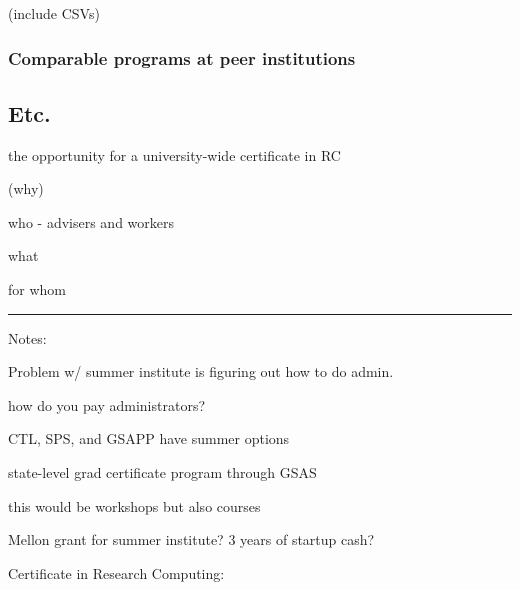 \documentclass[%
  ,
  article,
  ,
  oneside
  ]{memoir}
\begin{document}
(include CSVs)

\hypertarget{comparable-programs-at-peer-institutions}{%
\subsubsection{Comparable programs at peer
institutions}\label{comparable-programs-at-peer-institutions}}

\hypertarget{etc.}{%
\subsection{Etc.}\label{etc.}}

the opportunity for a university-wide certificate in RC

(why)

who - advisers and workers

what

for whom

\begin{center}\rule{0.5\linewidth}{0.5pt}\end{center}

Notes:

Problem w/ summer institute is figuring out how to do admin.

how do you pay administrators?

CTL, SPS, and GSAPP have summer options

state-level grad certificate program through GSAS

this would be workshops but also courses

Mellon grant for summer institute? 3 years of startup cash?

Certificate in Research Computing:
\end{document}
